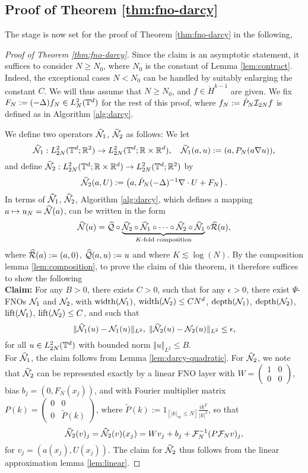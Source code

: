 \documentclass[reqno,a4paper]{amsart}
\begin{document}
\subsection{Proof of Theorem \ref{thm:fno-darcy}}
\label{app:fno-darcy}
The stage is now set for the proof of Theorem \ref{thm:fno-darcy} in the following,
\begin{proof}[Proof of Theorem \ref{thm:fno-darcy}]
Since the claim is an asymptotic statement, it suffices to consider $N\ge N_0$, where $N_0$ is the constant of Lemma \ref{lem:contract}. Indeed, the exceptional cases $N< N_0$ can be handled by suitably enlarging the constant $C$. We will thus assume that $N\ge N_0$, and $f\in \dot{H}^{k-1}$ are given. We fix $F_N := (-\Delta)f_N \in L^2_{N}(\mathbb{T}^d)$ for the rest of this proof, where $f_N:= \dot{P}_N \mathcal{I}_{2N}f$ is defined as in Algorithm \ref{alg:darcy}. 

We define two operators $\widehat{\mathcal{N}}_1$, $\widehat{\mathcal{N}}_2$ as follows: We let
\[
\widehat{\mathcal{N}}_1: L^2_{2N}(\mathbb{T}^d;\mathbb{R}^2) \to L^2_{2N}(\mathbb{T}^d;\mathbb{R}\times \mathbb{R}^{d}),
\quad
\widehat{\mathcal{N}}_1(a,u) := (a,P_N(a\nabla u)),
\]
and define $\widehat{\mathcal{N}}_2: L^2_{2N}(\mathbb{T}^d;\mathbb{R}\times \mathbb{R}^d) \to L^2_{2N}(\mathbb{T}^d;\mathbb{R}^2)$ by
\[
\widehat{\mathcal{N}}_2(a,U) := \left(a,\dot{P}_N (-\Delta)^{-1} \nabla \cdot U + F_N\right).
\]
In terms of $\widehat{\mathcal{N}}_1$, $\widehat{\mathcal{N}}_2$, Algorithm \ref{alg:darcy}, which defines a mapping $a \mapsto u_N = \widehat{\mathcal{N}}(a)$, can be written in the form 
\[
\widehat{\mathcal{N}}(a) 
=
\widehat{\mathcal{Q}} \circ \underbrace{\widehat{\mathcal{N}}_2 \circ \widehat{\mathcal{N}}_1 \circ \dots \circ \widehat{\mathcal{N}}_2 \circ \widehat{\mathcal{N}}_1}_{\text{$K$-fold composition}} \circ \widehat{\mathcal{R}}(a),
\]
where $\widehat{\mathcal{R}}(a) := (a,0)$, $\widehat{\mathcal{Q}}(a,u) := u$ and where $K \lesssim\log(N)$. By the composition lemma \ref{lem:composition}, to prove the claim of this theorem, it therefore suffices to show the following\\

\noindent
\textbf{Claim:} For any $B>0$, there exists $C>0$, such that for any $\epsilon > 0$, there exist $\Psi$-FNOs $\mathcal{N}_1$ and $\mathcal{N}_2$, with $\mathrm{width}(\mathcal{N}_1)$, $\mathrm{width}(\mathcal{N}_2) \le CN^d$, $\mathrm{depth}(\mathcal{N}_1)$, $\mathrm{depth}(\mathcal{N}_2)$, $\mathrm{lift}(\mathcal{N}_1)$, $\mathrm{lift}(\mathcal{N}_2) \le C$, and such that 
\[
\Vert \widehat{\mathcal{N}}_1(u) - \mathcal{N}_1(u) \Vert_{L^2}, \; \Vert \widehat{\mathcal{N}}_2(u) - \mathcal{N}_2(u) \Vert_{L^2} \le \epsilon,
\]
for all $u\in L^2_{2N}(\mathbb{T}^d)$ with bounded norm $\Vert u \Vert_{L^2}\le B$.\\

\noindent
For $\widehat{\mathcal{N}}_1$, the claim follows from Lemma \ref{lem:darcy-quadratic}. For $\widehat{\mathcal{N}}_2$, we note that $\widehat{\mathcal{N}}_2$ can be represented exactly by a linear FNO layer with $W = \begin{pmatrix} 1 & 0 \\ 0 & 0 \end{pmatrix}$, bias $b_j = (0,F_{N}(x_j))$, and with Fourier multiplier matrix $P(k) = \begin{pmatrix} 0 & 0 \\ 0 & \tilde{P}(k) \end{pmatrix}$, where $\tilde{P}(k) := 1_{[|k|_\infty \le N]} \frac{ik^T}{|k|^2}$, so that
\[
\widehat{\mathcal{N}}_2(v)_j = \widehat{\mathcal{N}}_2(v)(x_j)
=
Wv_j + b_j + \mathcal{F}_N^{-1}( P\mathcal{F}_N v)_j, 
\]
for $v_j = (a(x_j), U(x_j))$. The claim for $\widehat{\mathcal{N}}_2$ thus follows from the linear approximation lemma \ref{lem:linear}.
\end{proof}
\end{document}
